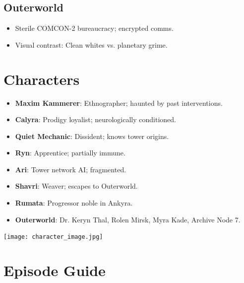\documentclass[10pt,letterpaper]{article}
\begin{document}
\begin{paracol}{2}
\subsection{Outerworld}
\begin{itemize}
    \item Sterile COMCON-2 bureaucracy; encrypted comms.
    \item Visual contrast: Clean whites vs. planetary grime.
\end{itemize}

\switchcolumn

\section{Characters}
\begin{itemize}
    \item \textbf{Maxim Kammerer}: Ethnographer; haunted by past interventions.
    \item \textbf{Calyra}: Prodigy loyalist; neurologically conditioned.
    \item \textbf{Quiet Mechanic}: Dissident; knows tower origins.
    \item \textbf{Ryn}: Apprentice; partially immune.
    \item \textbf{Ari}: Tower network AI; fragmented.
    \item \textbf{Shavri}: Weaver; escapes to Outerworld.
    \item \textbf{Rumata}: Progressor noble in Ankyra.
    \item \textbf{Outerworld}: Dr. Keryn Thal, Rolen Mirsk, Myra Kade, Archive Node 7.
\end{itemize}

\begin{center}
\texttt{[image: character\_image.jpg]} %
\end{center}

\section{Episode Guide}

\end{paracol}
\end{document}
